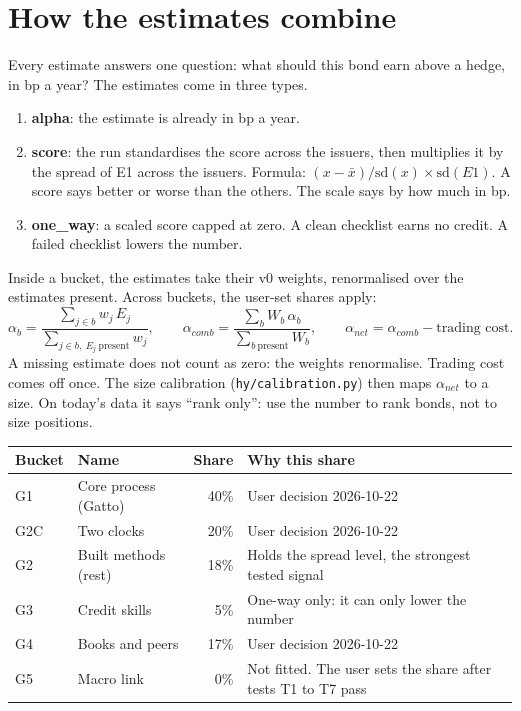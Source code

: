 \documentclass[10pt,a4paper]{article}
\begin{document}
\section{How the estimates combine}
Every estimate answers one question: what should this bond earn above a hedge, in bp a year? The estimates come in three types.
\begin{enumerate}
\item \textbf{alpha}: the estimate is already in bp a year.
\item \textbf{score}: the run standardises the score across the issuers, then multiplies it by the spread of E1 across the issuers. Formula: $(x - \bar x)/\mathrm{sd}(x) \times \mathrm{sd}(E1)$. A score says better or worse than the others. The scale says by how much in bp.
\item \textbf{one\_way}: a scaled score capped at zero. A clean checklist earns no credit. A failed checklist lowers the number.
\end{enumerate}
Inside a bucket, the estimates take their v0 weights, renormalised over the estimates present. Across buckets, the user-set shares apply:
\[
\alpha_b = \frac{\sum_{j \in b} w_j\,E_j}{\sum_{j \in b,\ E_j\ \text{present}} w_j}, \qquad
\alpha_{comb} = \frac{\sum_b W_b\,\alpha_b}{\sum_{b\ \text{present}} W_b}, \qquad
\alpha_{net} = \alpha_{comb} - \text{trading cost}.
\]
A missing estimate does not count as zero: the weights renormalise. Trading cost comes off once. The size calibration (\texttt{hy/calibration.py}) then maps $\alpha_{net}$ to a size. On today's data it says ``rank only'': use the number to rank bonds, not to size positions.

\begin{center}
\begin{tabular}{llrP{8.2cm}}
\toprule
Bucket & Name & Share & Why this share \\\midrule
G1 & Core process (Gatto) & 40\% & User decision 2026-10-22 \\
G2C & Two clocks & 20\% & User decision 2026-10-22 \\
G2 & Built methods (rest) & 18\% & Holds the spread level, the strongest tested signal \\
G3 & Credit skills & 5\% & One-way only: it can only lower the number \\
G4 & Books and peers & 17\% & User decision 2026-10-22 \\
G5 & Macro link & 0\% & Not fitted. The user sets the share after tests T1 to T7 pass \\
\bottomrule
\end{tabular}
\end{center}
\end{document}
